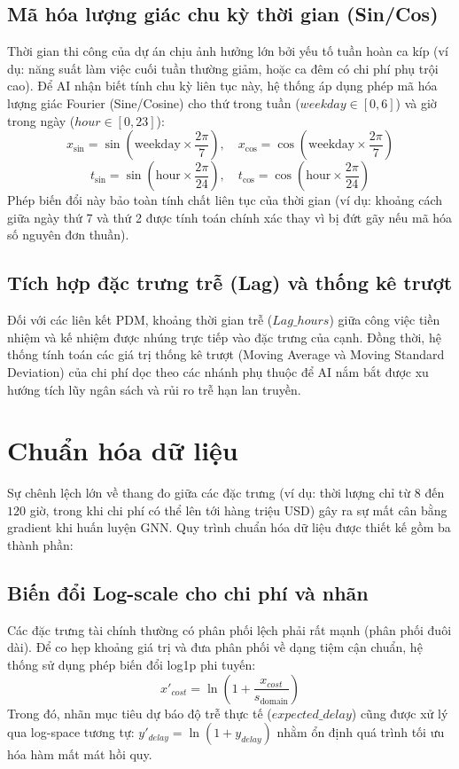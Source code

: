 \subsection{Mã hóa lượng giác chu kỳ thời gian (Sin/Cos)}
Thời gian thi công của dự án chịu ảnh hưởng lớn bởi yếu tố tuần hoàn ca kíp (ví dụ: năng suất làm việc cuối tuần thường giảm, hoặc ca đêm có chi phí phụ trội cao). Để AI nhận biết tính chu kỳ liên tục này, hệ thống áp dụng phép mã hóa lượng giác Fourier (Sine/Cosine) cho thứ trong tuần ($weekday \in [0, 6]$) và giờ trong ngày ($hour \in [0, 23]$):
$$x_{\sin} = \sin\left(\text{weekday} \times \frac{2\pi}{7}\right), \quad x_{\cos} = \cos\left(\text{weekday} \times \frac{2\pi}{7}\right)$$
$$t_{\sin} = \sin\left(\text{hour} \times \frac{2\pi}{24}\right), \quad t_{\cos} = \cos\left(\text{hour} \times \frac{2\pi}{24}\right)$$
Phép biến đổi này bảo toàn tính chất liên tục của thời gian (ví dụ: khoảng cách giữa ngày thứ 7 và thứ 2 được tính toán chính xác thay vì bị đứt gãy nếu mã hóa số nguyên đơn thuần).

\subsection{Tích hợp đặc trưng trễ (Lag) và thống kê trượt}
Đối với các liên kết PDM, khoảng thời gian trễ ($Lag\_hours$) giữa công việc tiền nhiệm và kế nhiệm được nhúng trực tiếp vào đặc trưng của cạnh. Đồng thời, hệ thống tính toán các giá trị thống kê trượt (Moving Average và Moving Standard Deviation) của chi phí dọc theo các nhánh phụ thuộc để AI nắm bắt được xu hướng tích lũy ngân sách và rủi ro trễ hạn lan truyền.

\section{Chuẩn hóa dữ liệu}
\label{sec:2.7_data_normalization}

Sự chênh lệch lớn về thang đo giữa các đặc trưng (ví dụ: thời lượng chỉ từ $8$ đến $120$ giờ, trong khi chi phí có thể lên tới hàng triệu USD) gây ra sự mất cân bằng gradient khi huấn luyện GNN. Quy trình chuẩn hóa dữ liệu được thiết kế gồm ba thành phần:

\subsection{Biến đổi Log-scale cho chi phí và nhãn}
Các đặc trưng tài chính thường có phân phối lệch phải rất mạnh (phân phối đuôi dài). Để co hẹp khoảng giá trị và đưa phân phối về dạng tiệm cận chuẩn, hệ thống sử dụng phép biến đổi log1p phi tuyến:
$$x'_{cost} = \ln\left(1 + \frac{x_{cost}}{s_{\text{domain}}}\right)$$
Trong đó, nhãn mục tiêu dự báo độ trễ thực tế ($expected\_delay$) cũng được xử lý qua log-space tương tự: $y'_{delay} = \ln(1 + y_{delay})$ nhằm ổn định quá trình tối ưu hóa hàm mất mát hồi quy.

